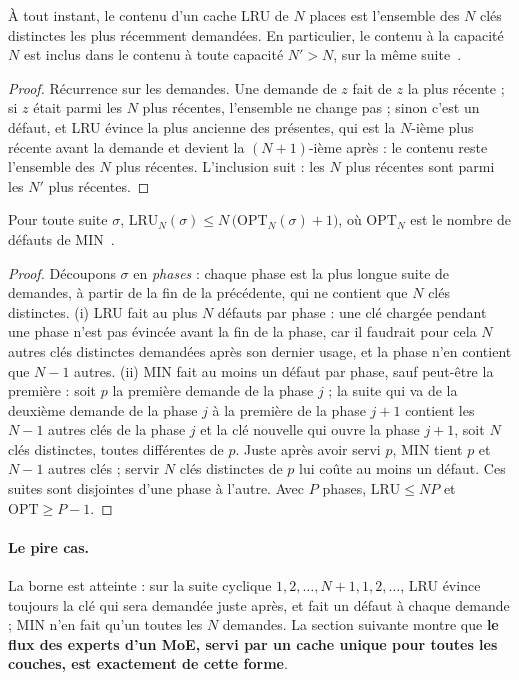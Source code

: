 \begin{proposition}\label{prop:t2o-pile}
À tout instant, le contenu d'un cache LRU de $N$ places est l'ensemble des $N$ clés distinctes les plus récemment demandées. En particulier, le contenu à la capacité $N$ est inclus dans le contenu à toute capacité $N' > N$, sur la même suite~\cite{mattson1970}.
\end{proposition}

\begin{proof}
Récurrence sur les demandes. Une demande de $z$ fait de $z$ la plus récente ; si $z$ était parmi les $N$ plus récentes, l'ensemble ne change pas ; sinon c'est un défaut, et LRU évince la plus ancienne des présentes, qui est la $N$-ième plus récente avant la demande et devient la $(N{+}1)$-ième après : le contenu reste l'ensemble des $N$ plus récentes. L'inclusion suit : les $N$ plus récentes sont parmi les $N'$ plus récentes.
\end{proof}

\begin{theoreme}\label{thm:t2o-competitif}
Pour toute suite $\sigma$, $\mathrm{LRU}_N(\sigma) \le N\,\big(\mathrm{OPT}_N(\sigma) + 1\big)$, où $\mathrm{OPT}_N$ est le nombre de défauts de MIN~\cite{sleator1985}.
\end{theoreme}

\begin{proof}
Découpons $\sigma$ en \emph{phases} : chaque phase est la plus longue suite de demandes, à partir de la fin de la précédente, qui ne contient que $N$ clés distinctes. (i) LRU fait au plus $N$ défauts par phase : une clé chargée pendant une phase n'est pas évincée avant la fin de la phase, car il faudrait pour cela $N$ autres clés distinctes demandées après son dernier usage, et la phase n'en contient que $N - 1$ autres. (ii) MIN fait au moins un défaut par phase, sauf peut-être la première : soit $p$ la première demande de la phase $j$ ; la suite qui va de la deuxième demande de la phase $j$ à la première de la phase $j+1$ contient les $N - 1$ autres clés de la phase $j$ et la clé nouvelle qui ouvre la phase $j+1$, soit $N$ clés distinctes, toutes différentes de $p$. Juste après avoir servi $p$, MIN tient $p$ et $N - 1$ autres clés ; servir $N$ clés distinctes de $p$ lui coûte au moins un défaut. Ces suites sont disjointes d'une phase à l'autre. Avec $P$ phases, $\mathrm{LRU} \le N P$ et $\mathrm{OPT} \ge P - 1$.
\end{proof}

\paragraph{Le pire cas.} La borne est atteinte : sur la suite cyclique $1, 2, \ldots, N+1, 1, 2, \ldots$, LRU évince toujours la clé qui sera demandée juste après, et fait un défaut à chaque demande ; MIN n'en fait qu'un toutes les $N$ demandes. La section suivante montre que \textbf{le flux des experts d'un MoE, servi par un cache unique pour toutes les couches, est exactement de cette forme}.

